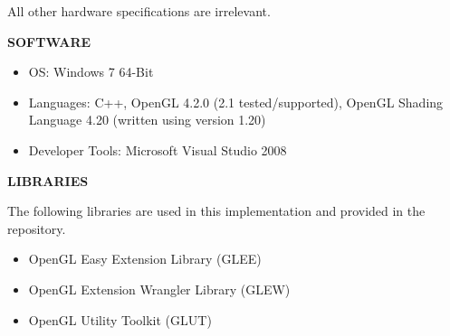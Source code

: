 All other hardware specifications are irrelevant.

\vspace{10 mm}

\textbf{SOFTWARE}
\begin{itemize}
\item OS: Windows 7 64-Bit
\item Languages: C++, OpenGL 4.2.0 (2.1 tested/supported), OpenGL Shading Language 4.20 (written using version 1.20)
\item Developer Tools: Microsoft Visual Studio 2008
\end{itemize}

\vspace{10 mm}

\textbf{LIBRARIES}

\vspace{1 mm}

The following libraries are used in this implementation and provided in the repository.

\begin{itemize}
\item OpenGL Easy Extension Library (GLEE)
\item OpenGL Extension Wrangler Library (GLEW)
\item OpenGL Utility Toolkit (GLUT)
\end{itemize}

